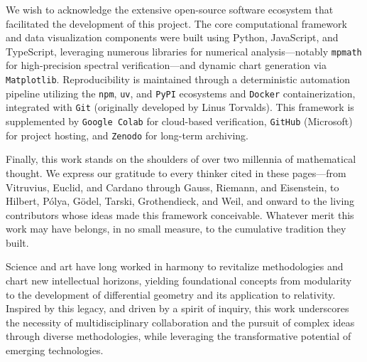 We wish to acknowledge the extensive open-source software ecosystem that facilitated the development of this project. The core computational framework and data visualization components were built using Python, JavaScript, and TypeScript, leveraging numerous libraries for numerical analysis---notably \texttt{mpmath} for high-precision spectral verification---and dynamic chart generation via \texttt{Matplotlib}. Reproducibility is maintained through a deterministic automation pipeline utilizing the \texttt{npm}, \texttt{uv}, and \texttt{PyPI} ecosystems and \texttt{Docker} containerization, integrated with \texttt{Git} (originally developed by Linus Torvalds). This framework is supplemented by \texttt{Google Colab} for cloud-based verification, \texttt{GitHub} (Microsoft) for project hosting, and \texttt{Zenodo} for long-term archiving.

Finally, this work stands on the shoulders of over two millennia of
mathematical thought.  We express our gratitude to every thinker cited in
these pages---from Vitruvius, Euclid, and Cardano through Gauss, Riemann,
and Eisenstein, to Hilbert, P\'olya, G\"odel, Tarski, Grothendieck, and
Weil, and onward to the living contributors whose ideas made this
framework conceivable.  Whatever merit this work may have belongs, in no
small measure, to the cumulative tradition they built.

Science and art have long worked in harmony to revitalize methodologies and chart new intellectual horizons, yielding foundational concepts from modularity to the development of differential geometry and its application to relativity. Inspired by this legacy, and driven by a spirit of inquiry, this work underscores the necessity of multidisciplinary collaboration and the pursuit of complex ideas through diverse methodologies, while leveraging the transformative potential of emerging technologies.
